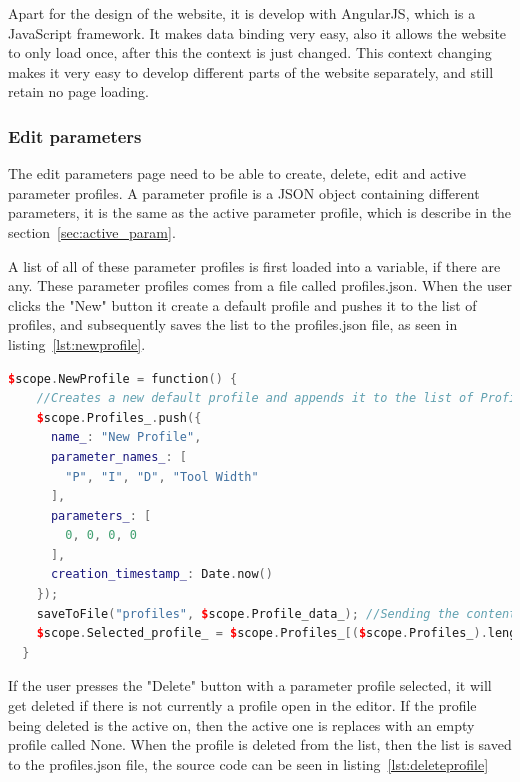 Apart for the design of the website, it is develop with AngularJS\cite{angular}, which is a JavaScript framework. It makes data binding very easy, also it allows the website to only load once, after this the context is just changed. This context changing makes it very easy to develop different parts of the website separately, and still retain no page loading.

\subsubsection{Edit parameters}
The edit parameters page need to be able to create, delete, edit and active parameter profiles. A parameter profile is a JSON object containing different parameters, it is the same as the active parameter profile, which is describe in the section~\ref{sec:active_param}.

A list of all of these parameter profiles is first loaded into a variable, if there are any. These parameter profiles comes from a file called profiles.json. When the user clicks the "New" button it create a default profile and pushes it to the list of profiles, and subsequently saves the list to the profiles.json file, as seen in listing~\ref{lst:newprofile}. 

\begin{lstlisting}[caption = {NewProfile function in editParam.js}, captionpos=b, label={lst:newprofile}, language=C++,firstnumber=1]
 $scope.NewProfile = function() {
    //Creates a new default profile and appends it to the list of Profiles_
    $scope.Profiles_.push({
      name_: "New Profile",
      parameter_names_: [
        "P", "I", "D", "Tool Width"
      ],
      parameters_: [
        0, 0, 0, 0
      ],
      creation_timestamp_: Date.now()
    });
    saveToFile("profiles", $scope.Profile_data_); //Sending the content to the server to get saved.
    $scope.Selected_profile_ = $scope.Profiles_[($scope.Profiles_).length - 1]; // Selects the new profile in the ui
  }
\end{lstlisting}

If the user presses the "Delete" button with a parameter profile selected, it will get deleted if there is not currently a profile open in the editor. If the profile being deleted is the active on, then the active one is replaces with an empty profile called None. When the profile is deleted from the list, then the list is saved to the profiles.json file, the source code can be seen in listing~\ref{lst:deleteprofile}

